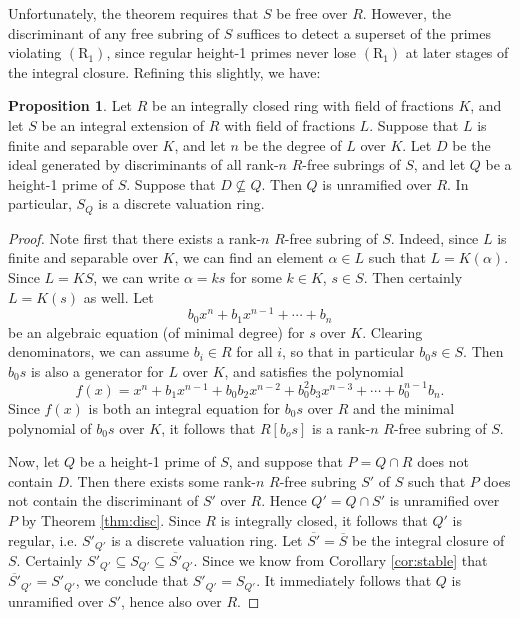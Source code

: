 \documentclass{amsart}
\theoremstyle{definition}
\newtheorem{proposition}[theorem]{Proposition}
\newcommand{\Rone}{(\text{R}_1)}
\begin{document}
Unfortunately, the theorem requires that $S$ be free over $R$.  However, the discriminant of any free subring of $S$ suffices to detect a superset of the primes violating $\Rone$, since regular height-1 primes never lose $\Rone$ at later stages of the integral closure.  Refining this slightly, we have:
\begin{proposition}
Let $R$ be an integrally closed ring with field of fractions $K$, and let $S$ be an integral extension of $R$ with field of fractions $L$.  Suppose that $L$ is finite and separable over $K$, and let $n$ be the degree of $L$ over $K$.  Let $D$ be the ideal generated by discriminants of all rank-$n$ $R$-free subrings of $S$, and let $Q$ be a height-1 prime of $S$.  Suppose that $D\nsubseteq Q$.  Then $Q$ is unramified over $R$.  In particular, $S_{Q}$ is a discrete valuation ring.
\end{proposition}
\begin{proof}
Note first that there exists a rank-$n$ $R$-free subring of $S$.  Indeed, since $L$ is finite and separable over $K$, we can find an element $\alpha \in L$ such that $L = K(\alpha)$.  Since $L = KS$, we can write $\alpha = ks$ for some $k\in K$, $s\in S$.  Then certainly $L=K(s)$ as well. 
Let
$$b_0x^n + b_1 x^{n-1} + \cdots + b_n$$
be an algebraic equation (of minimal degree) for $s$ over $K$.  Clearing denominators, we can assume $b_i\in R$ for all $i$, so that in particular $b_0s \in S$.  Then $b_0s$ is also a generator for $L$ over $K$, and satisfies the polynomial
$$f(x) = x^n + b_1 x^{n-1} + b_0b_2x^{n-2} + b_0^2b_3 x^{n-3} + \cdots + b_0^{n-1}b_n.$$
Since $f(x)$ is both an integral equation for $b_0s$ over $R$ and the minimal polynomial of $b_0s$ over $K$, it follows that $R[b_os]$ is a rank-$n$ $R$-free subring of $S$.

Now, let $Q$ be a height-1 prime of $S$, and suppose that $P = Q\cap R$ does not contain $D$.  Then there exists some rank-$n$ $R$-free subring $S'$ of $S$ such that $P$ does not contain the discriminant of $S'$ over $R$.  Hence $Q' = Q \cap S'$ is unramified over $P$ by Theorem \ref{thm:disc}.  Since $R$ is integrally closed, it follows that $Q'$ is regular, i.e. $S'_{Q'}$ is a discrete valuation ring.  Let $\overline{S'} = \overline{S}$ be the integral closure of $S$.  Certainly $S'_{Q'} \subseteq S_{Q'} \subseteq \overline{S'}_{Q'}$.  Since we know from Corollary \ref{cor:stable} that $\overline{S'}_{Q'} = S'_{Q'}$, we conclude that $S'_{Q'} = S_{Q'}$.  It immediately follows that $Q$ is unramified over $S'$, hence also over $R$.
\end{proof}
\end{document}
